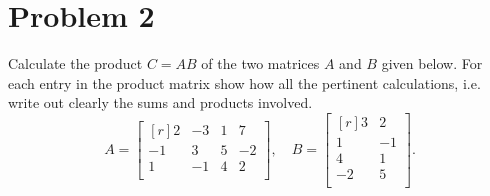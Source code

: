 \section{Problem 2}%
\label{sec:problem_2}
Calculate the product $C = AB$ of the two matrices $A$ and $B$ given below. For each entry in the product matrix show how all the pertinent calculations, i.e. write out clearly the sums and products involved.
\begin{equation*}
  A = \begin{bmatrix*}[r]
    2  & -3 & 1 & 7 \\
    -1 & 3  & 5 & -2 \\
    1  & -1 & 4 & 2 \\
  \end{bmatrix*}, \quad
  B = \begin{bmatrix*}[r]
    3  & 2 \\
    1  & -1 \\
    4  & 1 \\
    -2 & 5 \\
  \end{bmatrix*}.
\end{equation*}
\begin{solution}
  \quad
  
\end{solution}

